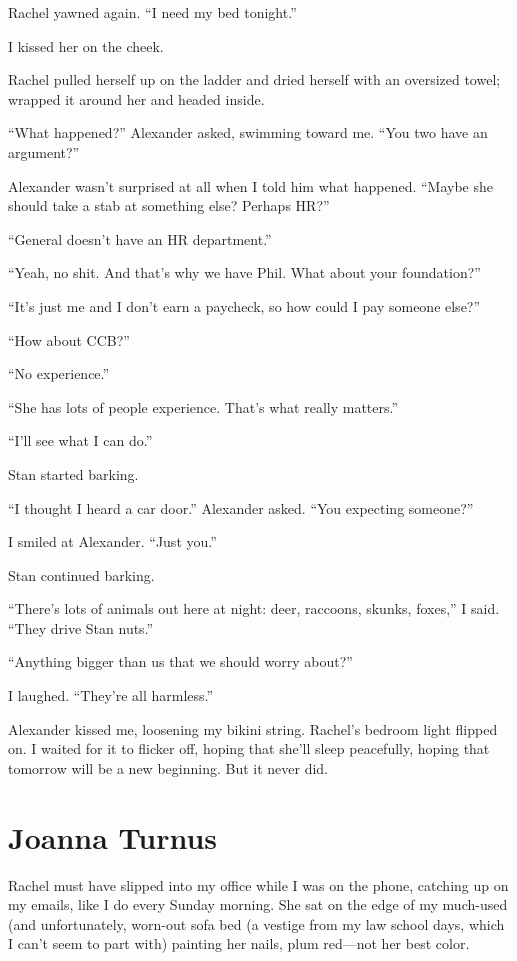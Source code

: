 Rachel yawned again. ``I need my bed tonight.''

I kissed her on the cheek.

Rachel pulled herself up on the ladder and dried herself with an
oversized towel; wrapped it around her and headed inside.

``What happened?'' Alexander asked, swimming toward me. ``You two have
an argument?''

Alexander wasn't surprised at all when I told him what happened. ``Maybe
she should take a stab at something else? Perhaps HR?''

``General doesn't have an HR department.''

``Yeah, no shit. And that's why we have Phil. What about your
foundation?''

``It's just me and I don't earn a paycheck, so how could I pay someone
else?''

``How about CCB?''

``No experience.''

``She has lots of people experience. That's what really matters.''

``I'll see what I can do.''

Stan started barking.

``I thought I heard a car door.'' Alexander asked. ``You expecting
someone?''

I smiled at Alexander. ``Just you.''

Stan continued barking.

``There's lots of animals out here at night: deer, raccoons, skunks,
foxes,'' I said. ``They drive Stan nuts.''

``Anything bigger than us that we should worry about?''

I laughed. ``They're all harmless.''

Alexander kissed me, loosening my bikini string. Rachel's bedroom light
flipped on. I waited for it to flicker off, hoping that she'll sleep
peacefully, hoping that tomorrow will be a new beginning. But it never
did.

\chapter{Joanna Turnus}

\titlemark

Rachel must have slipped into my office while I was on the phone,
catching up on my emails, like I do every Sunday morning. She sat on the
edge of my much-used (and unfortunately, worn-out sofa bed (a vestige
from my law school days, which I can't seem to part with) painting her
nails, plum red---not her best color.

